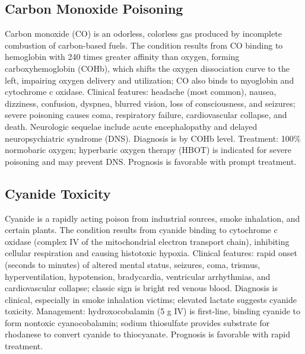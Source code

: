 \subsection{Carbon Monoxide Poisoning}
\label{sec:Carbon Monoxide Poisoning}
Carbon monoxide (CO) is an odorless, colorless gas produced by incomplete combustion of carbon-based fuels. The condition results from CO binding to hemoglobin with 240 times greater affinity than oxygen, forming carboxyhemoglobin (COHb), which shifts the oxygen dissociation curve to the left, impairing oxygen delivery and utilization; CO also binds to myoglobin and cytochrome c oxidase. Clinical features: headache (most common), nausea, dizziness, confusion, dyspnea, blurred vision, loss of consciousness, and seizures; severe poisoning causes coma, respiratory failure, cardiovascular collapse, and death. Neurologic sequelae include acute encephalopathy and delayed neuropsychiatric syndrome (DNS). Diagnosis is by COHb level. Treatment: 100\% normobaric oxygen; hyperbaric oxygen therapy (HBOT) is indicated for severe poisoning and may prevent DNS. Prognosis is favorable with prompt treatment.

\subsection{Cyanide Toxicity}
\label{sec:Cyanide Toxicity}
Cyanide is a rapidly acting poison from industrial sources, smoke inhalation, and certain plants. The condition results from cyanide binding to cytochrome c oxidase (complex IV of the mitochondrial electron transport chain), inhibiting cellular respiration and causing histotoxic hypoxia. Clinical features: rapid onset (seconds to minutes) of altered mental status, seizures, coma, trismus, hyperventilation, hypotension, bradycardia, ventricular arrhythmias, and cardiovascular collapse; classic sign is bright red venous blood. Diagnosis is clinical, especially in smoke inhalation victims; elevated lactate suggests cyanide toxicity. Management: hydroxocobalamin (5 g IV) is first-line, binding cyanide to form nontoxic cyanocobalamin; sodium thiosulfate provides substrate for rhodanese to convert cyanide to thiocyanate. Prognosis is favorable with rapid treatment.


